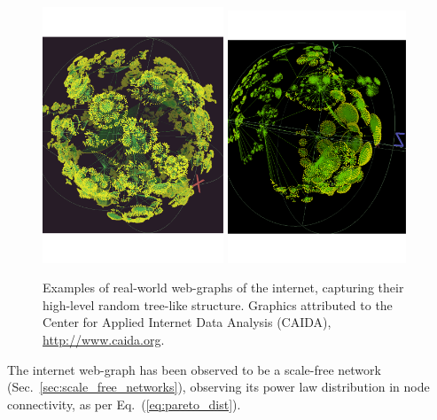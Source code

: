 	\begin{figure}[!htbp]
	\includegraphics[clip=true, width=0.481\textwidth]{webgraph_1}
	\includegraphics[clip=true, width=0.475\textwidth]{webgraph_2}
	\captionspacefig \caption{Examples of real-world web-graphs of the internet, capturing their high-level random tree-like structure. Graphics attributed to the Center for Applied Internet Data Analysis (CAIDA), \href{http://www.caida.org}{http://www.caida.org}.} \label{fig:webgraph}
	\end{figure}
\fi

The internet web-graph has been observed to be a scale-free network (Sec.~\ref{sec:scale_free_networks}), observing its power law distribution in node connectivity, as per Eq.~(\ref{eq:pareto_dist}).

%
%

